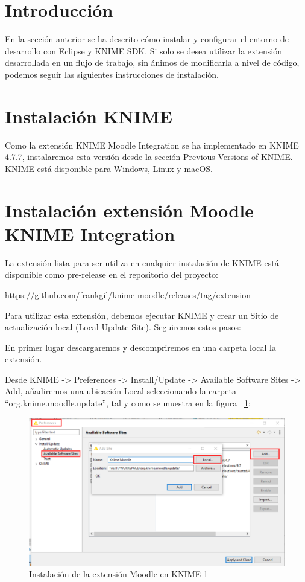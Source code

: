 
\section{Introducción}

En la sección anterior se ha descrito cómo instalar y configurar el entorno de desarrollo con Eclipse y KNIME SDK. Si solo se desea
utilizar la extensión desarrollada en un flujo de trabajo, sin ánimos de modificarla a nivel de código, podemos seguir las siguientes instrucciones
de instalación. 

\section{Instalación KNIME}

Como la extensión KNIME Moodle Integration se ha implementado en KNIME 4.7.7, instalaremos esta versión desde la sección \href{https://www.knime.com/download-previous-versions}{Previous Versions of KNIME}. 
KNIME está disponible para Windows, Linux y macOS.


\section{Instalación extensión Moodle KNIME Integration}

La extensión lista para ser utiliza en cualquier instalación de KNIME está disponible como pre-release en el repositorio del proyecto: 

\url{https://github.com/frankgil/knime-moodle/releases/tag/extension}

Para utilizar esta extensión, debemos ejecutar KNIME y crear un Sitio de actualización local 
(Local Update Site). Seguiremos estos pasos:
\

En primer lugar descargaremos y descompriremos en una carpeta local la extensión. 
\

Desde KNIME -> Preferences -> Install/Update -> Available Software Sites -> Add, añadiremos 
una ubicación Local seleccionando la carpeta ``org.knime.moodle.update'', tal y como se muestra en la figura ~\ref{fig:usuario1}: 

\begin{figure}[!htb]
	\centering
	\includegraphics[width=1\textwidth]{img/manual_usuario_install_site_update1.png}
	\caption{Instalación de la extensión Moodle en KNIME 1}
	\label{fig:usuario1}
\end{figure}
\FloatBarrier

